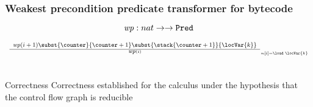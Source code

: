 \documentclass{beamer}
\begin{document}
\begin{frame}\frametitle{Weakest precondition predicate transformer for bytecode}
\begin{definition}
   $$\mbox{\rm\textit{wp}}:  nat \rightarrow  \rightarrow \mbox{\rm\texttt{Pred}} $$
\end{definition}

\begin{example}
   $$ {\small \begin{array}{l}
        
      \frac{ \begin{array}{l}
	       \wpi(i+1)\subst{\counter}{\counter+1} \subst{\stack{\counter + 1}}{\locVar{k}} \\
              
             \end{array}
           }{\wpi(i)}_{\tiny \methodd[i] = \load \  \locVar{k} }
         
	 
	\\\\\\

        
      \end{array} } $$
\end{example}

\begin{block}{Correctness}
Correctness established for the calculus  under the hypothesis that the control flow graph is reducible
\end{block}

\end{frame}
\end{document}
